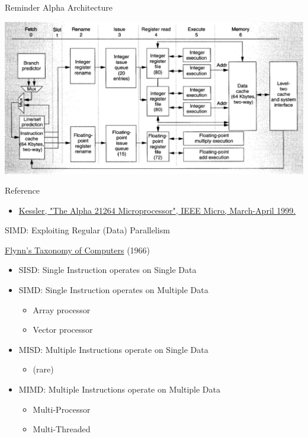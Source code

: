 \documentclass[presentation]{beamer}
\begin{document}
\begin{frame}[label={sec:orgc46e959}]{Reminder Alpha Architecture}
\begin{center}
\includegraphics[width=.9\linewidth]{./images/slides_SIMD_09_small.png}
\end{center}
\begin{block}{Reference}
\begin{itemize}
\item \small \href{https://www.cis.upenn.edu/\~milom/cis501-Fall09/papers/Alpha21264.pdf}{Kessler, "The Alpha 21264 Microprocessor", IEEE Micro, March-April 1999.}
\end{itemize}
\end{block}
\end{frame}


\begin{frame}[label={sec:org430c225}]{SIMD: Exploiting Regular (Data) Parallelism}
\begin{block}{\href{https://course.ece.cmu.edu/\~ece447/s13/lib/exe/fetch.php?media=01447203.pdf}{Flynn's Taxonomy of Computers} (\alert{1966})}
\begin{itemize}
\item SISD: Single Instruction operates on Single Data
\pause
\item \alert{SIMD}: Single Instruction operates on Multiple Data
\begin{itemize}
\item Array processor
\item Vector processor
\end{itemize}
\pause
\item MISD: Multiple Instructions operate on Single Data
\begin{itemize}
\item (rare)
\end{itemize}
\pause
\item MIMD: Multiple Instructions operate on Multiple Data
\begin{itemize}
\item Multi-Processor
\item Multi-Threaded
\end{itemize}
\end{itemize}
\end{block}
\end{frame}
\end{document}
